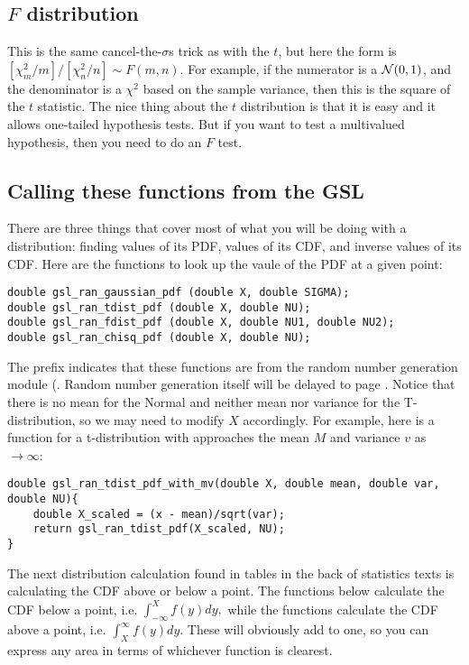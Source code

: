 \subsection{$F$ distribution}  This is the same cancel-the-$\sigma$s trick as with the $t$, but here the form
is $[\chi^2_m/m]/[\chi^2_n/n]\sim F(m,n)$. For example, if the numerator
is a ${\cal N}(0,1)$, and the denominator is a $\chi^2$ based on the
sample variance, then this is the square of the $t$ statistic.
The nice thing about the $t$ distribution is that it is easy and it
allows one-tailed hypothesis tests. But if you want to test a
multivalued hypothesis, then you need to do an $F$ test.

\subsection{Calling these functions from the GSL}
There are three things that cover most of what you will be doing with a
distribution: finding values of its PDF, values of its CDF, and inverse
values of its CDF.
Here are the functions to look up the vaule of the PDF at a given point:
\begin{lstlisting}
double gsl_ran_gaussian_pdf (double X, double SIGMA);
double gsl_ran_tdist_pdf (double X, double NU);
double gsl_ran_fdist_pdf (double X, double NU1, double NU2);
double gsl_ran_chisq_pdf (double X, double NU);
\end{lstlisting}

The prefix  indicates that these functions are from the
random number generation module (. Random number generation itself will be delayed to page
\pageref{randomnumbers}. Notice that there is no mean for the Normal and neither mean nor variance
for the T-distribution, so we may need to modify $X$ accordingly. For
example, here is a function for a t-distribution with approaches the
mean $M$ and variance $v$ as $\to \infty$:
\begin{lstlisting}
double gsl_ran_tdist_pdf_with_mv(double X, double mean, double var, double NU){
    double X_scaled = (x - mean)/sqrt(var);
    return gsl_ran_tdist_pdf(X_scaled, NU);
}
\end{lstlisting}

The next distribution calculation found in tables in the back of
statistics texts is calculating the CDF above or below a point. 
The functions below calculate the CDF below a point, i.e.
$\int_{-\infty}^X f(y) dy,$
while the functions calculate the CDF above a point, i.e.
$\int^{\infty}_X f(y) dy.$
These will obviously add to one, so you can express any area in terms of whichever function is clearest.


